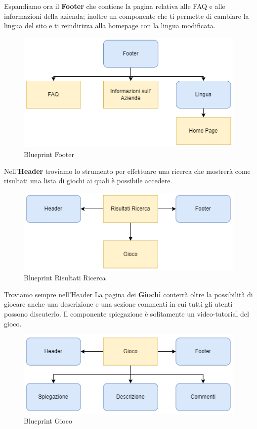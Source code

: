 \documentclass[../Report.tex]{subfiles}
\begin{document}
    Espandiamo ora il \textbf{Footer} che contiene la pagina relativa alle FAQ e alle informazioni della azienda; inoltre un componente che ti permette di cambiare la lingua del sito e ti reindirizza alla homepage con la lingua modificata.
    \begin{figure}[H]
        \includegraphics[width=.8\linewidth]{BP_footer.png}
        \centering
        \caption{Blueprint Footer}
    \end{figure}

    Nell'\textbf{Header} troviamo lo strumento per effettuare una ricerca che mostrerà come risultati una lista di giochi ai quali è possibile accedere.
    \begin{figure}[H]
        \includegraphics[width=.8\linewidth]{BP_RisultatiRicerca.png}
        \centering
        \caption{Blueprint Risultati Ricerca}
    \end{figure}

    Troviamo sempre nell'Header 
    La pagina dei \textbf{Giochi} conterrà oltre la possibilità di giocare anche una descrizione e una sezione commenti in cui tutti gli utenti possono discuterlo.
    Il componente spiegazione è solitamente un video-tutorial del gioco.
    \begin{figure}[H]
        \includegraphics[width=\linewidth]{BP_Gioco.png}
        \centering
        \caption{Blueprint Gioco}
    \end{figure}
\end{document}

